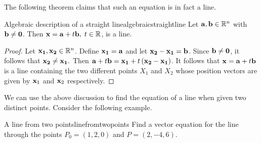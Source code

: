 The following theorem claims that such an equation is in fact a line. 

\begin{proposition}{Algebraic description of a straight line}{algebraicstraightline}
Let ${\bf a},{\bf b}\in \mathbb{R}^{n}$ with ${\bf b}\neq {\bf 0}$. 
Then ${\bf x}={\bf a}+t{\bf b},\; t\in \mathbb{R}$, is a
line.
\end{proposition}

\begin{proof}
Let ${\bf x_{1}}, {\bf x_{2}} \in \mathbb{R}^n$. 
Define ${\bf x_{1}}={\bf a}$ and let ${\bf x_{2}}-{\bf x_{1}}={\bf b}$.
Since ${\bf b} \neq {\bf 0}$, it follows that ${\bf x_{2}}\neq {\bf x_{1}}.$ Then
${\bf a}+t{\bf b}={\bf x_{1}} + t\left( {\bf x_{2}}-{\bf x_{1}}\right) $. It follows that  
${\bf x}={\bf a}+t{\bf b}$ is a line containing the two different points 
$X_1$ and $X_2$ whose position vectors are given by ${\bf x}_1$ and ${\bf x}_2$ respectively. 
\end{proof}

We can use the above discussion to find the equation of a line when given two distinct points.
Consider the following example. 

\begin{example}{A line from two points}{linefromtwopoints}
Find a vector equation for the line through the points $P_0 = \left(
1,2,0\right) $ and $P = \left( 2,-4,6\right).$
\end{example}


